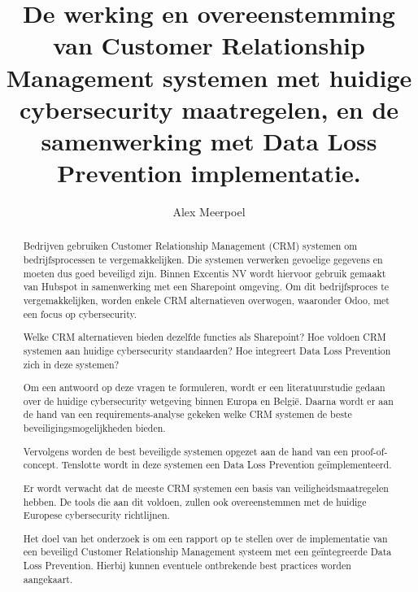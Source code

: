 \documentclass{hogent-article}
\title{De werking en overeenstemming van Customer Relationship Management systemen met huidige cybersecurity maatregelen, en de samenwerking met Data Loss Prevention implementatie.}
\author{Alex Meerpoel}
\begin{document}
\begin{abstract}
  Bedrijven gebruiken Customer Relationship Management (CRM) systemen om bedrijfsprocessen te vergemakkelijken. Die systemen verwerken gevoelige gegevens en moeten dus goed beveiligd zijn.
  Binnen Excentis NV wordt hiervoor gebruik gemaakt van Hubspot in samenwerking met een Sharepoint omgeving. Om dit bedrijfsproces te vergemakkelijken, worden enkele CRM alternatieven overwogen, waaronder Odoo, met een focus op cybersecurity.
  
  Welke CRM alternatieven bieden dezelfde functies als Sharepoint? Hoe voldoen CRM systemen aan huidige cybersecurity standaarden? Hoe integreert Data Loss Prevention zich in deze systemen?
  
  Om een antwoord op deze vragen te formuleren, wordt er een literatuurstudie gedaan over de huidige cybersecurity wetgeving binnen Europa en België. Daarna wordt er aan de hand van een requirements-analyse gekeken welke CRM systemen de beste beveiligingsmogelijkheden bieden.
  
  Vervolgens worden de best beveiligde systemen opgezet aan de hand van een proof-of-concept. Tenslotte wordt in deze systemen een Data Loss Prevention geïmplementeerd.
  
  Er wordt verwacht dat de meeste CRM systemen een basis van veiligheidsmaatregelen hebben. De tools die aan dit voldoen, zullen ook overeenstemmen met de huidige Europese cybersecurity richtlijnen.
  
  Het doel van het onderzoek is om een rapport op te stellen over de implementatie van een beveiligd Customer Relationship Management systeem met een geïntegreerde Data Loss Prevention. Hierbij kunnen eventuele ontbrekende best practices worden aangekaart.
  
\end{abstract}

\tableofcontents



\printbibliography[heading=bibintoc]
\end{document}
